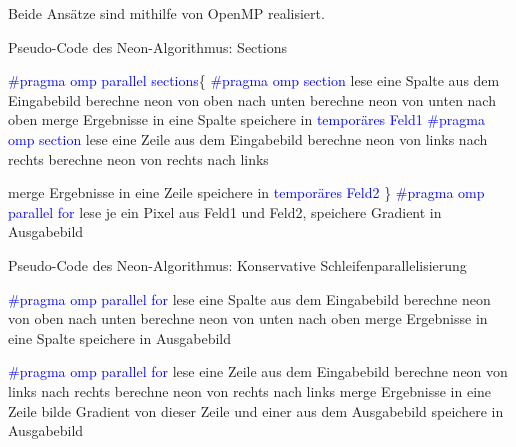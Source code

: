 Beide Ansätze sind mithilfe von OpenMP realisiert.





\newpage
\begin{algorithm}[H]
\caption{Pseudo-Code des \glqq Neon\grqq-Algorithmus: Sections}
\label{algo:neon_sections}
\begin{algorithmic}[1]
\State \textcolor{blue}{\#pragma omp parallel sections}\{
\State \textcolor{blue}{\#pragma omp section} 
	\State lese eine Spalte aus dem Eingabebild
		\State berechne neon von oben nach unten
	\EndFor
		\State berechne neon von unten nach oben
	\EndFor
	\State merge Ergebnisse in eine Spalte
	\State speichere in \textcolor{blue}{temporäres Feld1}
\EndFor	
\State \textcolor{blue}{\#pragma omp section}
	\State lese eine Zeile aus dem Eingabebild
		\State berechne neon von links nach rechts
	\EndFor
		\State berechne neon von rechts nach links
	\EndFor	
	
		\State merge Ergebnisse in eine Zeile
	\State speichere in \textcolor{blue}{temporäres Feld2}
\EndFor
\State \}
\State \textcolor{blue}{\#pragma omp parallel for }
	\State \label{neon_keine_datenabhaengigkeit} lese je ein Pixel aus Feld1 und Feld2,  speichere Gradient in Ausgabebild
\EndFor
\end{algorithmic}
\end{algorithm}

\begin{algorithm}[H]
\caption{Pseudo-Code des \glqq Neon\grqq-Algorithmus: Konservative Schleifenparallelisierung}
\label{algo:neon_conservative}
\begin{algorithmic}[1]
\State \textcolor{blue}{\#pragma omp parallel for }
	\State lese eine Spalte aus dem Eingabebild
		\State berechne neon von oben nach unten
	\EndFor
		\State berechne neon von unten nach oben
	\EndFor
	\State merge Ergebnisse in eine Spalte
	\State speichere in Ausgabebild
\EndFor	


\State \textcolor{blue}{\#pragma omp parallel for }
	\State lese eine Zeile aus dem Eingabebild
		\State berechne neon von links nach rechts
	\EndFor
		\State berechne neon von rechts nach links
	\EndFor	
		\State merge Ergebnisse in eine Zeile
	\State bilde Gradient von dieser Zeile und einer aus dem Ausgabebild
	\State speichere in Ausgabebild
\EndFor
\end{algorithmic}
\end{algorithm}





















